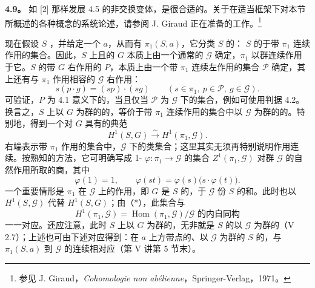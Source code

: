 \textbf{4.9。} 如 [2] 那样发展 4.5 的非交换变体，是很合适的。关于在适当框架下对本节所概述的各种概念的系统论述，请参阅 J. Giraud 正在准备的工作。\footnote{参见 J. Giraud，\textit{Cohomologie non abélienne}，Springer-Verlag，1971。}

现在假设 $S$ ，并给定一个 $a$，从而有 $\pi_1(S,a)$，它分类 $S$ 的：
$S$ 的于带 $\pi_1$ 连续作用的集合。因此，$S$ 上且的 $G$ 本质上由一个通常的 $\mathscr G$ 确定，$\pi_1$ 以群连续作用于它。$S$ 的带 $G$ 右作用的 $P$，本质上由一个带 $\pi_1$ 连续左作用的集合 $\mathscr P$ 确定，其上还有与 $\pi_1$ 作用相容的 $\mathscr G$ 右作用：
\[
s(p\cdot g)=(sp)\cdot(sg)\qquad
(s\in\pi_1,\ p\in\mathscr P,\ g\in\mathscr G).
\]
可验证，$P$ 为 4.1 意义下的，当且仅当 $\mathscr P$ 为 $\mathscr G$ 下的集合，例如可使用判据 4.2。换言之，$S$ 上以 $G$ 为群的的，等价于带 $\pi_1$ 连续作用的集合中以 $\mathscr G$ 为群的的。特别地，得到一个对 $G$ 具有的典范
\[
H^1(S,G)\xrightarrow{\sim}H^1(\pi_1,\mathscr G).\tag{*}
\]
右端表示带 $\pi_1$ 作用的集合中，$\mathscr G$ 下的类集合；这里其实无须再特别说明作用连续。按熟知的方法，它可明确写成 1- $\varphi:\pi_1\to\mathscr G$ 的集合 $Z^1(\pi_1,\mathscr G)$ 对群 $\mathscr G$ 的自然作用所取的商，其中
\[
\varphi(1)=1,\qquad \varphi(st)=\varphi(s)\bigl(s\cdot\varphi(t)\bigr).
\]
一个重要情形是 $\pi_1$ 在 $\mathscr G$ 上的作用，即 $G$ 是 $S$ 的，于 $\mathscr G$ 份 $S$ 的和。此时也以 $H^1(S,\mathscr G)$ 代替 $H^1(S,G)$；由（*），此集合与
\[
H^1(\pi_1,\mathscr G)
=\operatorname{Hom}(\pi_1,\mathscr G)/\mathscr G\text{ 的内自同构}
\]
一一对应。还应注意，此时 $S$ 上以 $G$ 为群的，无非就是 $S$ 的以 $\mathscr G$ 为群的（V 2.7）；上述也可由下述对应得到：在 $a$ 上方带点的、以 $\mathscr G$ 为群的 $S$ 的，与 $\pi_1(S,a)$ 到 $\mathscr G$ 的连续相对应（第 V 讲第 5 节末）。


